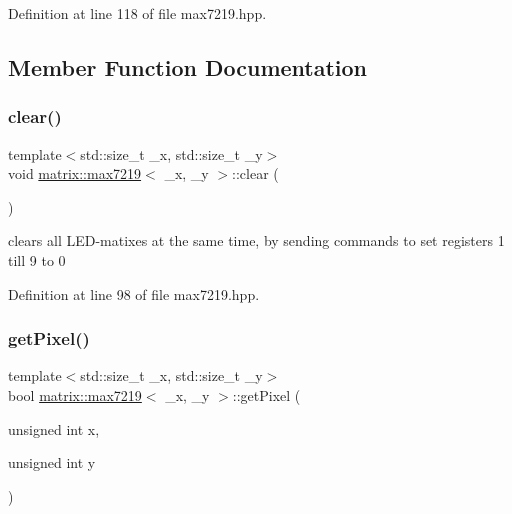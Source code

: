 Definition at line 118 of file max7219.\+hpp.



\subsection{Member Function Documentation}
\mbox{\label{classmatrix_1_1max7219_a15e123a5bdfa2df3cb6dedf99dd12162}} 
\subsubsection{\texorpdfstring{clear()}{clear()}}
{\footnotesize\ttfamily template$<$std\+::size\+\_\+t \+\_\+x, std\+::size\+\_\+t \+\_\+y$>$ \\
void \mbox{\hyperlink{classmatrix_1_1max7219}{matrix\+::max7219}}$<$ \+\_\+x, \+\_\+y $>$\+::clear (\begin{DoxyParamCaption}{ }\end{DoxyParamCaption})\hspace{0.3cm}{\ttfamily [inline]}}



clears all L\+E\+D-\/matixes at the same time, by sending commands to set registers 1 till 9 to 0 



Definition at line 98 of file max7219.\+hpp.

\mbox{\label{classmatrix_1_1max7219_a3bd74301ca921fbafe39cb516901dca2}} 
\subsubsection{\texorpdfstring{get\+Pixel()}{getPixel()}}
{\footnotesize\ttfamily template$<$std\+::size\+\_\+t \+\_\+x, std\+::size\+\_\+t \+\_\+y$>$ \\
bool \mbox{\hyperlink{classmatrix_1_1max7219}{matrix\+::max7219}}$<$ \+\_\+x, \+\_\+y $>$\+::get\+Pixel (\begin{DoxyParamCaption}\item[{unsigned int}]{x,  }\item[{unsigned int}]{y }\end{DoxyParamCaption})\hspace{0.3cm}{\ttfamily [inline]}}



